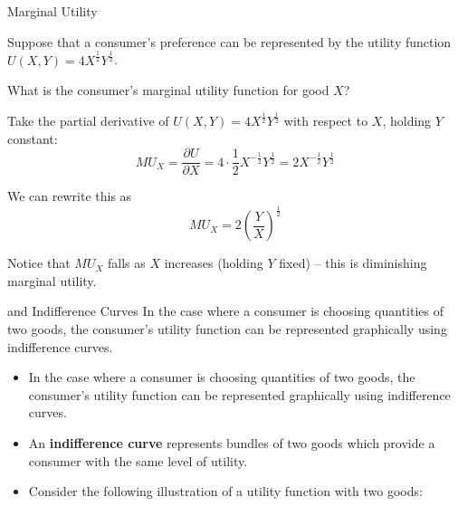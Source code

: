 \documentclass{beamer}
\begin{document}
\begin{frame}{Marginal Utility}

  \bigskip
  Suppose that a consumer's preference can be represented by the utility function $U(X,Y) = 4X^\frac{1}{2} Y^\frac{1}{2}$. 
  
  What is the consumer's marginal utility function for good $X$?
\end{frame}

\begin{frame}

  \bigskip
  Take the partial derivative of $U(X,Y) = 4X^{\frac{1}{2}}Y^{\frac{1}{2}}$ with respect to $X$, holding $Y$ constant:
  $$
    MU_X = \frac{\partial U}{\partial X} = 4 \cdot \frac{1}{2} X^{-\frac{1}{2}} Y^{\frac{1}{2}} = 2 X^{-\frac{1}{2}} Y^{\frac{1}{2}}
  $$

  \bigskip
  We can rewrite this as
  $$
    MU_X = 2 \left(\frac{Y}{X}\right)^{\frac{1}{2}}
  $$

  \bigskip
  Notice that $MU_X$ falls as $X$ increases (holding $Y$ fixed) -- this is diminishing marginal utility.
\end{frame}

\begin{frame}{ and Indifference Curves}
  In the case where a consumer is choosing quantities of two goods, the consumer's utility function can be represented graphically using indifference curves.

  \begin{itemize}
    \item In the case where a consumer is choosing quantities of two goods, the consumer's utility function can be represented graphically using indifference curves.

    \item An \textbf{indifference curve} represents bundles of two goods which provide a consumer with the same level of utility.

    \item Consider the following illustration of a utility function with two goods: 
  \end{itemize}
\end{frame}
\end{document}
